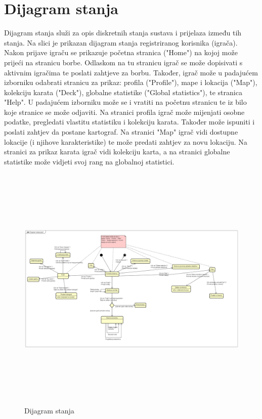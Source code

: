 		\section{Dijagram stanja}
			
			
			
			
		{Dijagram stanja služi za opis diskretnih stanja sustava i prijelaza između tih stanja. Na slici je prikazan dijagram stanja registriranog korisnika (igrača). Nakon prijave igraču se prikazuje početna stranica ("Home") na kojoj može prijeći na stranicu borbe. Odlaskom na tu stranicu igrač se može dopisivati s aktivnim igračima te poslati zahtjeve za borbu. Također, igrač može u padajućem izborniku odabrati stranicu za prikaz: profila ("Profile"), mape i lokacija ("Map"), kolekciju karata ("Deck"), globalne statistike ("Global statistics"), te stranica "Help". U padajućem izborniku može se i vratiti na početnu stranicu te iz bilo koje stranice se može odjaviti. Na stranici profila igrač može mijenjati osobne podatke, pregledati vlastitu statistiku i kolekciju karata. Također može ispuniti i poslati zahtjev da postane kartograf. Na stranici "Map" igrač vidi dostupne lokacije (i njihove karakteristike) te može predati zahtjev za novu lokaciju. Na stranici za prikaz karata igrač vidi kolekciju karta, a na stranici globalne statistike može vidjeti svoj rang na globalnoj statistici. }
			\begin{figure}[H]
				\includegraphics[width=18cm, height=12cm]{dijagrami/dijagram stanja-igrač}				
				\centering
				\caption{Dijagram stanja}
				\label{}
			\end{figure}
			\eject 
		
